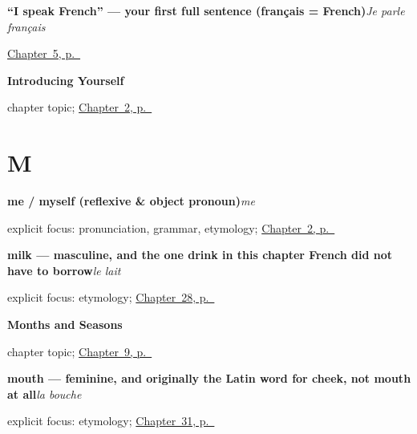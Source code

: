\noindent\begin{minipage}[t]{\linewidth}
\raggedright
\textbf{\textquotedblleft{}I speak French\textquotedblright{} — your first full sentence (français = French)}\enspace\emph{Je parle français}\par
\footnotesize \hyperref[ch:first-verbs]{Chapter~5, p.~\pageref*{ch:first-verbs}}
\end{minipage}\par\smallskip

\noindent\begin{minipage}[t]{\linewidth}
\raggedright
\textbf{Introducing Yourself}\par
\footnotesize chapter topic; \hyperref[ch:introductions]{Chapter~2, p.~\pageref*{ch:introductions}}
\end{minipage}\par\smallskip

\section*{M}

\noindent\begin{minipage}[t]{\linewidth}
\raggedright
\textbf{me / myself (reflexive \& object pronoun)}\enspace\emph{me}\par
\footnotesize explicit focus: pronunciation, grammar, etymology; \hyperref[ch:introductions]{Chapter~2, p.~\pageref*{ch:introductions}}
\end{minipage}\par\smallskip

\noindent\begin{minipage}[t]{\linewidth}
\raggedright
\textbf{milk — masculine, and the one drink in this chapter French did not have to borrow}\enspace\emph{le lait}\par
\footnotesize explicit focus: etymology; \hyperref[ch:fr-coffee-tea-milk-sugar]{Chapter~28, p.~\pageref*{ch:fr-coffee-tea-milk-sugar}}
\end{minipage}\par\smallskip

\noindent\begin{minipage}[t]{\linewidth}
\raggedright
\textbf{Months and Seasons}\par
\footnotesize chapter topic; \hyperref[ch:months-seasons]{Chapter~9, p.~\pageref*{ch:months-seasons}}
\end{minipage}\par\smallskip

\noindent\begin{minipage}[t]{\linewidth}
\raggedright
\textbf{mouth — feminine, and originally the Latin word for cheek, not mouth at all}\enspace\emph{la bouche}\par
\footnotesize explicit focus: etymology; \hyperref[ch:fr-eyes-nose-mouth-stomach]{Chapter~31, p.~\pageref*{ch:fr-eyes-nose-mouth-stomach}}
\end{minipage}\par\smallskip

